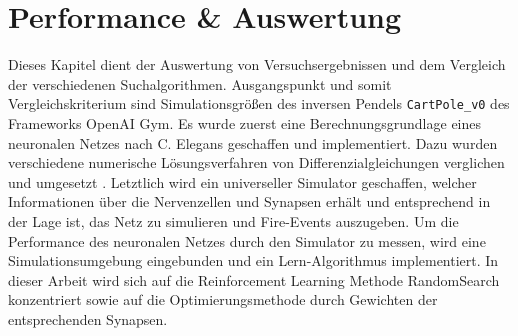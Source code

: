 %
\chapter{Performance \& Auswertung}
\label{chap:erg}
%
	Dieses Kapitel dient der Auswertung von Versuchsergebnissen und dem Vergleich der verschiedenen Suchalgorithmen. Ausgangspunkt und somit Vergleichskriterium sind Simulationsgrößen des inversen Pendels \texttt{CartPole\_v0} des Frameworks OpenAI Gym.
	Es wurde zuerst eine Berechnungsgrundlage eines neuronalen Netzes nach C. Elegans \cite{CElegans} geschaffen und implementiert. Dazu wurden verschiedene numerische Lösungsverfahren von Differenzialgleichungen verglichen und umgesetzt \cite{NonlinearDynamics}. Letztlich wird ein universeller Simulator geschaffen, welcher Informationen über die Nervenzellen und Synapsen erhält und entsprechend in der Lage ist, das Netz zu simulieren und Fire-Events auszugeben. Um die Performance des neuronalen Netzes durch den Simulator zu messen, wird eine Simulationsumgebung eingebunden und ein Lern-Algorithmus implementiert. In dieser Arbeit wird sich auf die Reinforcement Learning Methode RandomSearch konzentriert sowie auf die Optimierungsmethode durch Gewichten der entsprechenden Synapsen.

